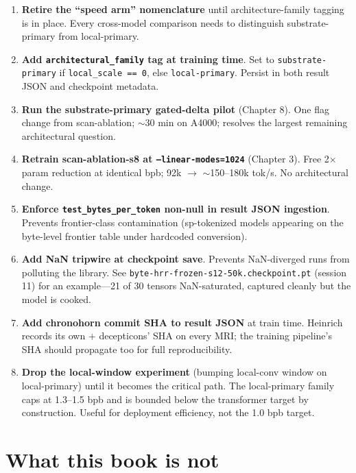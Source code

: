 \documentclass[11pt,openany]{book}
\begin{document}
\begin{enumerate}
  \item \textbf{Retire the ``speed arm'' nomenclature} until architecture-family
  tagging is in place. Every cross-model comparison needs to distinguish
  substrate-primary from local-primary.

  \item \textbf{Add \texttt{architectural\_family} tag at training time}.
  Set to \texttt{substrate-primary} if \texttt{local\_scale == 0}, else
  \texttt{local-primary}. Persist in both result JSON and checkpoint
  metadata.

  \item \textbf{Run the substrate-primary gated-delta pilot} (Chapter 8).
  One flag change from scan-ablation; $\sim$30 min on A4000; resolves the
  largest remaining architectural question.

  \item \textbf{Retrain scan-ablation-s8 at
  \texttt{--linear-modes=1024}} (Chapter 3). Free 2$\times$ param reduction
  at identical bpb; 92k $\to$ $\sim$150--180k tok/s. No architectural
  change.

  \item \textbf{Enforce \texttt{test\_bytes\_per\_token} non-null in result
  JSON ingestion}. Prevents frontier-class contamination (sp-tokenized models
  appearing on the byte-level frontier table under hardcoded conversion).

  \item \textbf{Add NaN tripwire at checkpoint save}. Prevents
  NaN-diverged runs from polluting the library. See
  \texttt{byte-hrr-frozen-s12-50k.checkpoint.pt} (session 11) for an
  example---21 of 30 tensors NaN-saturated, captured cleanly but the
  model is cooked.

  \item \textbf{Add chronohorn commit SHA to result JSON} at train time.
  Heinrich records its own + decepticons' SHA on every MRI; the training
  pipeline's SHA should propagate too for full reproducibility.

  \item \textbf{Drop the local-window experiment} (bumping local-conv window
  on local-primary) until it becomes the critical path. The local-primary
  family caps at 1.3--1.5 bpb and is bounded below the transformer target
  by construction. Useful for deployment efficiency, not the 1.0 bpb target.
\end{enumerate}

\chapter{What this book is not}
\end{document}
